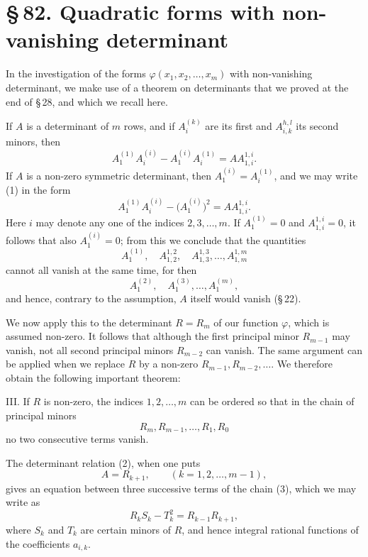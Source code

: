 \documentclass[11pt]{article}
\providecommand{\sect}[2]{\section*{\S\,#1. #2}}
\begin{document}
\sect{82}{Quadratic forms with non-vanishing determinant}

In the investigation of the forms $\varphi(x_1,x_2,\ldots,x_m)$ with non-vanishing determinant, we make use of a theorem on determinants that we proved at the end of \S\,28, and which we recall here.

If $A$ is a determinant of $m$ rows, and if $A_i^{(k)}$ are its first and $A_{i,k}^{h,l}$ its second minors, then
\begin{equation}
        A_1^{(1)}A_i^{(i)}-A_1^{(i)}A_i^{(1)}=A A_{1,i}^{1,i}.
\tag{1}
\end{equation}
If $A$ is a non-zero symmetric determinant, then $A_1^{(i)}=A_i^{(1)}$, and we may write (1) in the form
\begin{equation}
        A_1^{(1)}A_i^{(i)}-\bigl(A_1^{(i)}\bigr)^2=A A_{1,i}^{1,i}.
\tag{2}
\end{equation}
Here $i$ may denote any one of the indices $2,3,\ldots,m$. If $A_1^{(1)}=0$ and $A_{1,i}^{1,i}=0$, it follows that also $A_1^{(i)}=0$; from this we conclude that the quantities
\[
        A_1^{(1)},\quad A_{1,2}^{1,2},\quad A_{1,3}^{1,3},\ldots, A_{1,m}^{1,m}
\]
cannot all vanish at the same time, for then
\[
        A_1^{(2)},\quad A_1^{(3)},\ldots,A_1^{(m)},
\]
and hence, contrary to the assumption, $A$ itself would vanish (\S\,22).

We now apply this to the determinant $R=R_m$ of our function $\varphi$, which is assumed non-zero. It follows that although the first principal minor $R_{m-1}$ may vanish, not all second principal minors $R_{m-2}$ can vanish. The same argument can be applied when we replace $R$ by a non-zero $R_{m-1},R_{m-2},\ldots$. We therefore obtain the following important theorem:

III. If $R$ is non-zero, the indices $1,2,\ldots,m$ can be ordered so that in the chain of principal minors
\begin{equation}
        R_m, R_{m-1},\ldots,R_1,R_0
\tag{3}
\end{equation}
no two consecutive terms vanish.

The determinant relation (2), when one puts
\[
        A=R_{k+1},\qquad (k=1,2,
\ldots,m-1),
\]
gives an equation between three successive terms of the chain (3), which we may write as
\begin{equation}
        R_kS_k-T_k^2=R_{k-1}R_{k+1},
\tag{4}
\end{equation}
where $S_k$ and $T_k$ are certain minors of $R$, and hence integral rational functions of the coefficients $a_{i,k}$.
\end{document}
